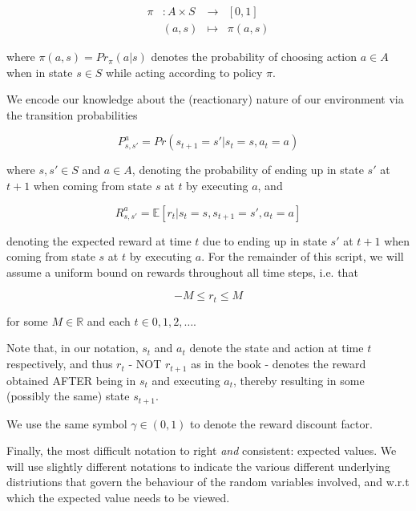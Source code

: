 \documentclass[11pt]{article} %
\begin{document}
\begin{equation}
	\begin{array}{llll}\label{ar_polMap}
		\pi 	& : A \times S 	& \to 	& [0,1] \\
			& (a,s)		& \mapsto	& \pi(a,s)
	\end{array}
\end{equation}

where $\pi(a,s) = Pr_{\pi}(a | s)$ denotes the probability of choosing action $a \in A$ when in state $s \in S$ while acting according to policy $\pi$.

We encode our knowledge about the (reactionary) nature of our environment via the transition probabilities

\begin{equation}\label{eq_transProb}
	P_{s,s'}^{a} = Pr(s_{t+1} = s' | s_t = s, a_t = a)
\end{equation}
 
where $s,s' \in S$ and $a \in A$, denoting the probability of ending up in state $s'$ at $t+1$ when coming from state $s$ at $t$ by executing $a$, and 

\begin{equation}\label{eq_rewExpVal}
	R_{s,s'}^{a} = \mathbb{E}[r_t | s_t = s, s_{t+1} = s', a_t = a]
\end{equation}

denoting the expected reward at time $t$ due to ending up in state $s'$ at $t+1$ when coming from state $s$ at $t$ by executing $a$. For the remainder of this script, we will assume a uniform bound on rewards throughout all time steps, i.e. that 

\begin{equation}\label{eq_rewBound}
	-M \le r_t \le M
\end{equation}

for some $M \in \mathbb{R}$ and each $t \in 0,1,2,\dots $.

Note that, in our notation, $s_t$ and $a_t$ denote the state and action at time $t$ respectively, and thus $r_t$ - NOT $r_{t+1}$ as in the book - denotes the reward obtained AFTER being in $s_t$ and executing $a_t$, thereby resulting in some (possibly the same) state $s_{t+1}$.

We use the same symbol $\gamma \in (0,1)$ to denote the reward discount factor.

Finally, the most difficult notation to right \textit{and} consistent: expected values. We will use slightly different notations to indicate the various different underlying distriutions that govern the behaviour of the random variables involved, and w.r.t which the expected value needs to be viewed.
\end{document}
